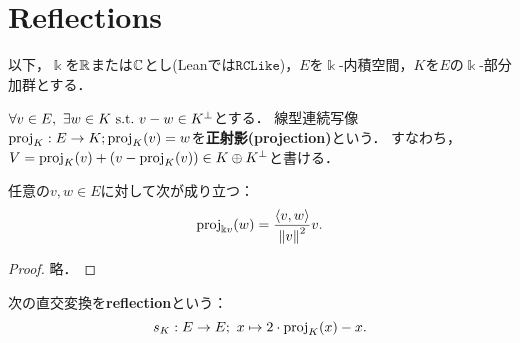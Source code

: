 %

\section{Reflections}
以下，$\Bbbk$を$\mathbb{R}$または$\mathbb{C}$とし(Leanでは$\mathtt{RCLike}$)，$E$を$\Bbbk$-内積空間，$K$を$E$の$\Bbbk$-部分加群とする．

\begin{definition}
  \label{defi:orthogonalProjection}
  \leanok
  $\forall v \in E,\ \exists w \in K \ \text{s.t.}\  v - w \in K^\perp$とする．
  線型連続写像$\operatorname{proj}_K : E \rightarrow K; \operatorname{proj}_K(v) = w$を\textbf{正射影(projection)}という．
  すなわち，$V = \operatorname{proj}_K(v) + (v - \operatorname{proj}_K(v)) \in K \oplus K^\perp$と書ける．
\end{definition}

\begin{theorem}
  \label{thm:orthogonalProjection_singleton}
  \leanok
  任意の$v, w \in E$に対して次が成り立つ：
  \begin{equation}
    \operatorname{proj}_{\Bbbk v}(w) = \frac{\left\langle v, w \right\rangle}{\left\| v \right\|^2} v.
  \end{equation}
\end{theorem}

\begin{proof}
  \leanok
  略．
\end{proof}

\begin{definition}
  \label{defi:reflection}
  \leanok
  次の直交変換を\textbf{reflection}という：
  \begin{equation}
    s_K : E \rightarrow E;\ x \mapsto 2 \cdot \operatorname{proj}_K(x) - x.
  \end{equation}
\end{definition}

